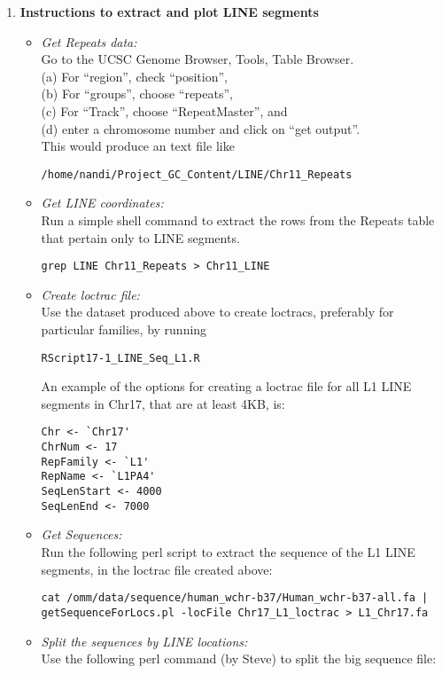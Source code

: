\documentclass[11pt]{article}
\begin{document}
\begin{enumerate}
\item
{\bf{Instructions to extract and plot LINE segments}}
\begin{itemize}
\item 
\emph{Get Repeats data:} \\ 
Go to the UCSC Genome Browser, Tools, Table Browser. \\
(a) For ``region'', check ``position'', \\
(b) For ``groups'', choose ``repeats'', \\
(c) For ``Track'', choose ``RepeatMaster'', and \\
(d) enter a chromosome number and click on ``get output''. \\ 
This would produce an text file like 
\begin{verbatim}
/home/nandi/Project_GC_Content/LINE/Chr11_Repeats
\end{verbatim}
\item
\emph{Get LINE coordinates:} \\ 
Run a simple shell command to extract the rows from the Repeats table that pertain only to LINE segments.
\begin{verbatim}
grep LINE Chr11_Repeats > Chr11_LINE
\end{verbatim}
\item
\emph{Create loctrac file:} \\ 
Use the dataset produced above to create loctracs, preferably for particular families, by running 
\begin{verbatim} 
RScript17-1_LINE_Seq_L1.R 
\end{verbatim} 
An example of the options for creating a loctrac file for all L1 LINE segments in Chr17, that are at least 4KB, is:
\begin{verbatim}
Chr <- `Chr17'
ChrNum <- 17
RepFamily <- `L1'
RepName <- `L1PA4'
SeqLenStart <- 4000
SeqLenEnd <- 7000
\end{verbatim}
\item
\emph{Get Sequences:} \\ 
Run the following perl script to extract the sequence of the L1 LINE segments, in the loctrac file created above:
\begin{verbatim}
cat /omm/data/sequence/human_wchr-b37/Human_wchr-b37-all.fa | 
getSequenceForLocs.pl -locFile Chr17_L1_loctrac > L1_Chr17.fa
\end{verbatim}
\item
\emph{Split the sequences by LINE locations:} \\
Use the following perl command (by Steve) to split the big sequence file: 

\end{itemize}
\end{enumerate}
\end{document}
